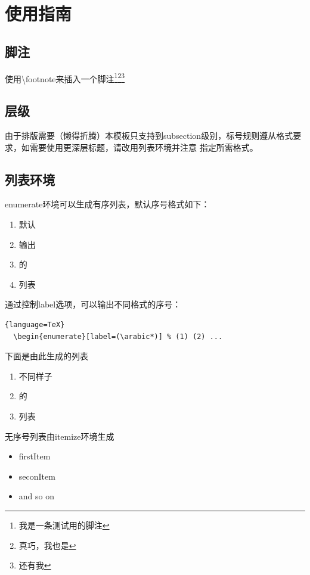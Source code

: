 \chapter{使用指南}

\section{脚注}
使用\textbackslash footnote来插入一个脚注\footnote{我是一条测试用的脚注}\footnote{真巧，我也是}\footnote{还有我}

\section{层级}
由于排版需要（懒得折腾）本模板只支持到subsection级别，标号规则遵从格式要求，如需要使用更深层标题，请改用列表环境并注意
指定所需格式。

\section{列表环境}

enumerate环境可以生成有序列表，默认序号格式如下：

\begin{enumerate}
\item 默认
\item 输出
\item 的
\item 列表
\end{enumerate}

通过控制label选项，可以输出不同格式的序号：

\begin{lstlisting}{language=TeX}
  \begin{enumerate}[label=(\arabic*)] % (1) (2) ...
\end{lstlisting}


下面是由此生成的列表

\begin{enumerate}[label=(\arabic*)]
\item 不同样子
\item 的
\item 列表
\end{enumerate}

无序号列表由itemize环境生成

\begin{itemize}
\item firstItem
\item seconItem
\item and so on
\end{itemize}

